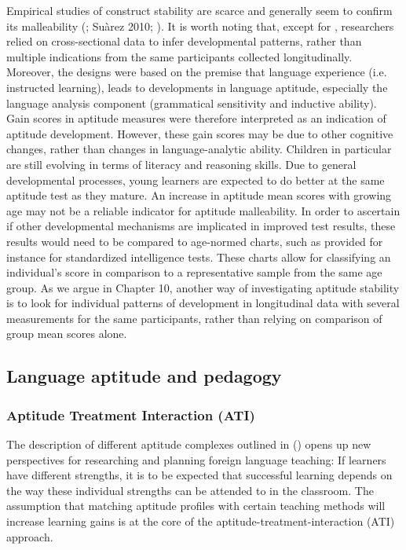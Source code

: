 \documentclass[output=paper]{langscibook}
\begin{document}
Empirical studies of construct stability are scarce and generally seem to confirm its malleability (\citealt{SafarKormos2008}; Suàrez 2010; \citealt{RoehrBrackinTellier2019}). It is worth noting that, except for \citealt{RoehrBrackinTellier2019}, researchers relied on cross-sectional data to infer developmental patterns, rather than multiple indications from the same participants collected longitudinally. Moreover, the designs were based on the premise that language experience (i.e. instructed learning), leads to developments in language aptitude, especially the language analysis component (grammatical sensitivity and inductive ability). Gain scores in aptitude measures were therefore interpreted as an indication of aptitude development. However, these gain scores may be due to other cognitive changes, rather than changes in language-analytic ability. Children in particular are still evolving in terms of literacy and reasoning skills. Due to general developmental processes, young learners are expected to do better at the same aptitude test as they mature. An increase in aptitude mean scores with growing age may not be a reliable indicator for aptitude malleability. In order to ascertain if other developmental mechanisms are implicated in improved test results, these results would need to be compared to age-normed charts, such as provided for instance for standardized intelligence tests. These charts allow for classifying an individual’s score in comparison to a representative sample from the same age group. As we argue in Chapter 10, another way of investigating aptitude stability is to look for individual patterns of development in longitudinal data with several measurements for the same participants, rather than relying on comparison of group mean scores alone.

\subsection{Language aptitude and pedagogy} %

\subsubsection{Aptitude Treatment Interaction (ATI)} %

The description of different aptitude complexes outlined in  (\citealt{Robinson2001,Robinson2002}) opens up new perspectives for researching and planning foreign language teaching: If learners have different strengths, it is to be expected that successful learning depends on the way these individual strengths can be attended to in the classroom. The assumption that matching aptitude profiles with certain teaching methods will increase learning gains is at the core of the aptitude-treatment-interaction (ATI) approach. 
\end{document}
